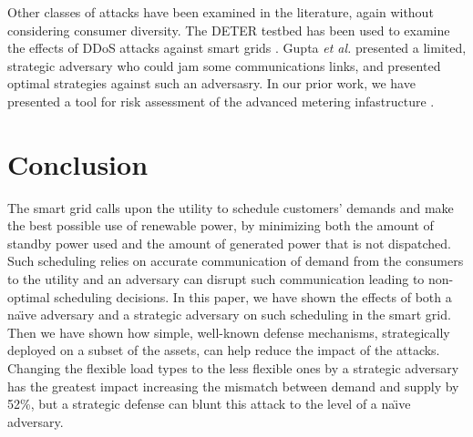 \documentclass[conference]{IEEEtran}
\begin{document}
Other classes of attacks have been examined in the literature, again without considering consumer diversity. The DETER testbed has been used to examine the effects of DDoS attacks against smart grids \cite{hussain2012ncs}. Gupta {\em et al.} \cite{gupta2010optimal} presented a limited, strategic adversary who could jam some communications links, and presented optimal strategies against such an adversasry. 
In our prior work, we have presented a tool for risk assessment of the advanced metering infastructure \cite{shawly2014risk}.


\section{Conclusion}
\label{Conclusion}

The smart grid calls upon the utility to schedule customers' demands and make the best possible use of renewable power, by minimizing both the amount of standby power used and the amount of generated power that is not dispatched. Such scheduling relies on accurate communication of demand from the consumers to the utility and an adversary can disrupt such communication leading to non-optimal scheduling decisions. In this paper, we have shown the effects of both a na\"\i ve adversary and a strategic adversary on such scheduling in the smart grid. Then we have shown how simple, well-known defense mechanisms, strategically deployed on a subset of the assets, can help reduce the impact of the attacks. Changing the flexible load types to the less flexible ones by a strategic adversary has the greatest impact increasing the mismatch between demand and supply by 52\%, but a strategic defense can blunt this attack to the level of a na\"\i ve adversary.

{\footnotesize


}
\end{document}
